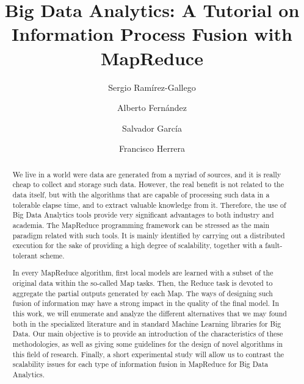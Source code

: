 \documentclass[3p,review]{elsarticle}
\begin{document}
\begin{frontmatter}

\title{Big Data Analytics: A Tutorial on Information Process Fusion with MapReduce}

\author[grx]{Sergio Ram\'irez-Gallego}

\author[grx]{Alberto Fern\'andez}

\author[grx]{Salvador Garc\'ia}

\author[grx]{Francisco Herrera}

\address[grx]{Department of Computer Science and Artificial Intelligence, University of Granada, Granada, Spain}



\begin{abstract}

We live in a world were data are generated from a myriad of sources, and it is really cheap to collect and storage such data. However, the real benefit is not related to the data itself, but with the algorithms that are capable of processing such data in a tolerable elapse time, and to extract valuable knowledge from it. Therefore, the use of Big Data Analytics tools provide very significant advantages to both industry and academia. The MapReduce programming framework can be stressed as the main paradigm related with such tools. It is mainly identified by carrying out a distributed execution for the sake of providing a high degree of scalability, together with a fault-tolerant scheme. 

In every MapReduce algorithm, first local models are learned with a subset of the original data within the so-called Map tasks. Then, the Reduce task is devoted to aggregate the partial outputs generated by each Map. The ways of designing such fusion of information may have a strong impact in the quality of the final model. In this work, we will enumerate and analyze the different alternatives that we may found both in the specialized literature and in standard Machine Learning libraries for Big Data. Our main objective is to provide an introduction of the characteristics of these methodologies, as well as giving some guidelines for the design of novel algorithms in this field of research.  Finally, a short experimental study will allow us to contrast the scalability issues for each type of information fusion in MapReduce for Big Data Analytics.


\end{abstract}
\end{frontmatter}
\end{document}
